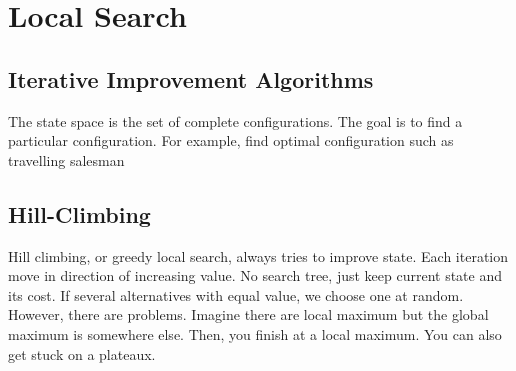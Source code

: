 \documentclass[a4paper]{article}
\theoremstyle{plain}
\theoremstyle{definition}
\theoremstyle{remark}
\begin{document}
\section{Local Search}
\subsection{Iterative Improvement Algorithms}
The state space is the set of complete configurations. The goal is to find a particular configuration. For example, find optimal configuration such as travelling salesman
\subsection{Hill-Climbing}
Hill climbing, or greedy local search, always tries to improve state. Each iteration move in direction of increasing value. No search tree, just keep current state and its cost. If several alternatives with equal value, we choose one at random. However, there are problems. Imagine there are local maximum but the global maximum is somewhere else. Then, you finish at a local maximum. You can also get stuck on a plateaux. 
\end{document}
